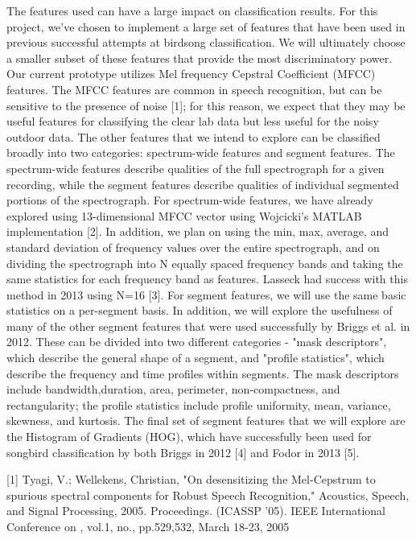   The features used can have a large impact on classification results. For this project, we've chosen to implement a
large set of features that have been used in previous successful attempts at birdsong classification. We will ultimately
choose a smaller subset of these features that provide the most discriminatory power. 
  Our current prototype utilizes Mel frequency Cepstral Coefficient (MFCC) features. The MFCC features are common in
speech recognition, but can be sensitive to the presence of noise [1]; for this reason, we expect that they may be
useful features for classifying the clear lab data but less useful for the noisy outdoor data. 
  The other features that we intend to explore can be classified broadly into two categories: spectrum-wide features and
segment features. The spectrum-wide features describe qualities of the full spectrograph for a given recording, while
the segment features describe qualities of individual segmented portions of the spectrograph.
  For spectrum-wide features, we have already explored using 13-dimensional MFCC vector using Wojcicki's MATLAB
implementation [2]. In addition, we plan on using the min, max, average, and standard deviation of frequency values over
the entire spectrograph, and on dividing the spectrograph into N equally spaced frequency bands and taking the same
statistics for each frequency band as features. Lasseck had success with this method in 2013 using N=16 [3].
  For segment features, we will use the same basic statistics on a per-segment basis. In addition, we will explore the
usefulness of many of the other segment features that were used successfully by Briggs et al. in 2012. These can be divided 
into two different categories - "mask descriptors", which describe the general shape of a segment, and "profile statistics", 
which describe the frequency and time profiles within segments. The mask descriptors include bandwidth,duration, area, 
perimeter, non-compactness, and rectangularity; the profile statistics include profile uniformity, mean, variance,
skewness, and kurtosis. The final set of segment features that we will explore are the Histogram of Gradients (HOG), 
which have successfully been used for songbird classification by both Briggs in 2012 [4] and Fodor in 2013 [5]. 


[1] Tyagi, V.; Wellekens, Christian, "On desensitizing the Mel-Cepstrum to spurious spectral components for Robust
Speech Recognition," Acoustics, Speech, and Signal Processing, 2005. Proceedings. (ICASSP '05). IEEE International
Conference on , vol.1, no., pp.529,532, March 18-23, 2005

